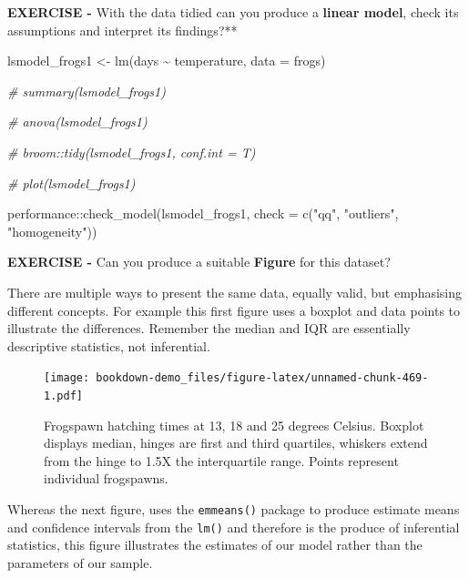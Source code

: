 \documentclass[
]{book}
\newenvironment{Shaded}{\begin{snugshade}}{\end{snugshade}}
\newcommand{\AttributeTok}[1]{\textcolor[rgb]{0.77,0.63,0.00}{#1}}
\newcommand{\CommentTok}[1]{\textcolor[rgb]{0.56,0.35,0.01}{\textit{#1}}}
\newcommand{\FunctionTok}[1]{\textcolor[rgb]{0.00,0.00,0.00}{#1}}
\newcommand{\NormalTok}[1]{#1}
\newcommand{\OtherTok}[1]{\textcolor[rgb]{0.56,0.35,0.01}{#1}}
\newcommand{\SpecialCharTok}[1]{\textcolor[rgb]{0.00,0.00,0.00}{#1}}
\newcommand{\StringTok}[1]{\textcolor[rgb]{0.31,0.60,0.02}{#1}}
\begin{document}
\textbf{EXERCISE -} With the data tidied can you produce a \textbf{linear model}, check its assumptions and interpret its findings?**

\begin{Shaded}
\begin{Highlighting}[]
\NormalTok{lsmodel\_frogs1 }\OtherTok{\textless{}{-}} \FunctionTok{lm}\NormalTok{(days }\SpecialCharTok{\textasciitilde{}}\NormalTok{ temperature, }\AttributeTok{data =}\NormalTok{ frogs)}

\CommentTok{\# summary(lsmodel\_frogs1)}

\CommentTok{\# anova(lsmodel\_frogs1)}

\CommentTok{\# broom::tidy(lsmodel\_frogs1, conf.int = T)}
\end{Highlighting}
\end{Shaded}

\begin{Shaded}
\begin{Highlighting}[]
\CommentTok{\# plot(lsmodel\_frogs1)}

\NormalTok{performance}\SpecialCharTok{::}\FunctionTok{check\_model}\NormalTok{(lsmodel\_frogs1,}
                         \AttributeTok{check =} \FunctionTok{c}\NormalTok{(}\StringTok{"qq"}\NormalTok{, }\StringTok{"outliers"}\NormalTok{, }\StringTok{"homogeneity"}\NormalTok{))}
\end{Highlighting}
\end{Shaded}

\textbf{EXERCISE -} Can you produce a suitable \textbf{Figure} for this dataset?

There are multiple ways to present the same data, equally valid, but emphasising different concepts. For example this first figure uses a boxplot and data points to illustrate the differences. Remember the median and IQR are essentially descriptive statistics, not inferential.

\begin{figure}
\centering
\texttt{[image: bookdown-demo\_files/figure-latex/unnamed-chunk-469-1.pdf]}
\caption{\label{fig:unnamed-chunk-469}Frogspawn hatching times at 13, 18 and 25 degrees Celsius. Boxplot displays median, hinges are first and third quartiles, whiskers extend from the hinge to 1.5X the interquartile range. Points represent individual frogspawns.}
\end{figure}

Whereas the next figure, uses the \texttt{emmeans()} package to produce estimate means and confidence intervals from the \texttt{lm()} and therefore is the produce of inferential statistics, this figure illustrates the estimates of our model rather than the parameters of our sample.
\end{document}
